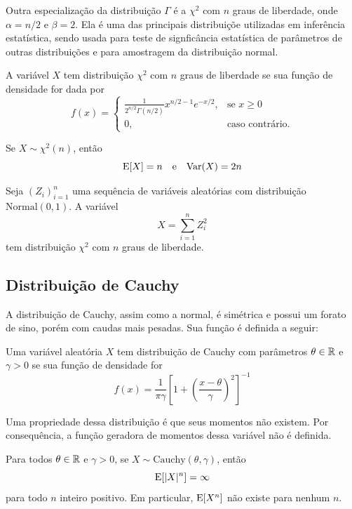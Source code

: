 Outra especialização da distribuição $\Gamma$ é a $\chi^2$ com $n$ graus de liberdade,
onde $\alpha = n/2$ e $\beta=2$.
Ela é uma das principais distribuiçõe utilizadas em inferência estatística, sendo usada
para teste de signficância estatística de parâmetros de outras distribuições e para
amostragem da distribuição normal.

\begin{def:chi quadrado}
A variável $X$ tem distribuição $\chi^2$ com $n$ graus de liberdade se sua função de
densidade for dada por
\[
    f(x) = \begin{cases}
        \frac{1}{2^{n/2} \Gamma(n/2)} x^{n/2-1}e^{-x/2},&\text{se } x \ge 0 \\
        0,&\text{caso contrário.}
    \end{cases}
\]
\end{def:chi quadrado}

\begin{prop:chi quadrado}
Se $X \sim \chi^2(n)$, então
\[
    \mathrm{E}\!\left[X\right] = n \quad \text{e} \quad \mathrm{Var}\!\left(X\right) = 2n
\]
\end{prop:chi quadrado}

\begin{prop:chi quadrado e normal}
Seja $(Z_i)_{i=1}^n$ uma sequência de variáveis aleatórias com distribuição
$\mathrm{Normal}(0, 1)$.
A variável
\[
    X = \sum_{i=1}^n Z_i^2
\]
tem distribuição $\chi^2$ com $n$ graus de liberdade.
\end{prop:chi quadrado e normal}

\subsection{Distribuição de Cauchy}

A distribuição de Cauchy, assim como a normal, é simétrica e possui um forato de sino,
porém com caudas mais pesadas.
Sua função é definida a seguir:

\begin{def:cauchy}
Uma variável aleatória $X$ tem distribuição de Cauchy com parâmetros $\theta \in \mathbb{R}$ e
$\gamma > 0$ se sua função de densidade for
\[
    f(x) = \frac{1}{\pi\gamma} \left[1 + \left(\frac{x - \theta}{\gamma}\right)^2\right]^{-1}
\]
\end{def:cauchy}

Uma propriedade dessa distribuição é que seus momentos não existem.
Por consequência, a função geradora de momentos dessa variável não é definida.

\begin{prop:cauchy nao tem momentos}
Para todos $\theta \in \mathbb{R}$ e $\gamma > 0$, se $X \sim \mathrm{Cauchy}(\theta, \gamma)$, então
\[
    \mathrm{E}\!\left[|X|^n\right] = \infty
\]
para todo $n$ inteiro positivo.
Em particular, $\mathrm{E}\!\left[X^n\right]$ não existe para nenhum $n$.
\end{prop:cauchy nao tem momentos}

